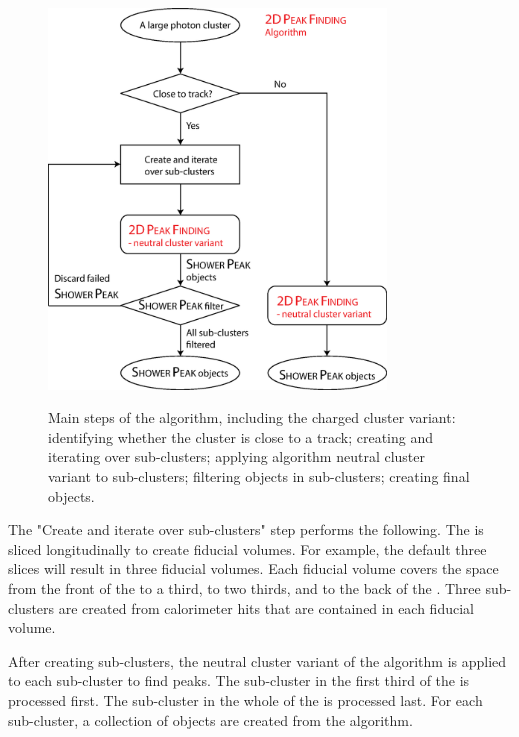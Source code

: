 \begin{figure}[tbph]
\centering
{\includegraphics[width=0.8\textwidth]{photon/2DpeakFindingTrack}}
\caption[Flow chart for \peakFinding algorithm.]
{Main steps of the  \peakFinding algorithm, including the charged cluster variant: identifying whether the cluster is close to a track; creating and iterating over sub-clusters; applying \peakFinding algorithm neutral cluster variant to sub-clusters; filtering \ShowerPeak objects in sub-clusters; creating final \ShowerPeak objects.}
\label{fig:photonPeakFindingFlow}
\end{figure}


The "Create and iterate over sub-clusters" step performs the following. The \ECAL is sliced longitudinally to create fiducial volumes. For example, the default three slices will result in three \ECAL fiducial volumes. Each fiducial volume covers the  space from the front of the \ECAL to a third, to two thirds, and to the back of the \ECAL. Three sub-clusters are created from calorimeter hits that are contained in each fiducial volume.

After creating sub-clusters, the neutral cluster variant of the  \peakFinding algorithm is applied to each sub-cluster to find peaks.  The sub-cluster in the first third of the \ECAL is processed first. The sub-cluster in the whole of the \ECAL is processed last. For each sub-cluster, a collection of \ShowerPeak objects are created from the  \peakFinding algorithm.

